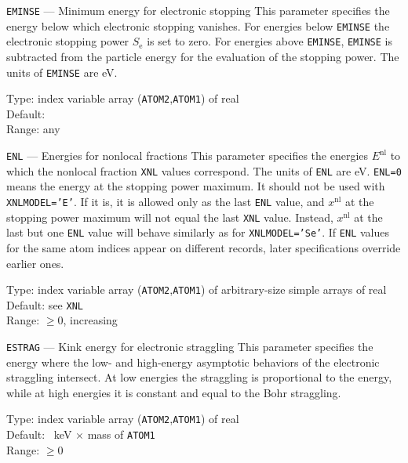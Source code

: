 \begin{keydescription}{\texttt{EMINSE} --- Minimum energy for electronic
    stopping}
%
  This parameter specifies the energy below which electronic stopping
  vanishes. For energies below \texttt{EMINSE} the electronic stopping
  power $S_\mathrm{e}$ is set to zero. For energies above \texttt{EMINSE},
  \texttt{EMINSE} is subtracted from the particle energy for the evaluation
  of the stopping power. The units of \texttt{EMINSE} are eV.
  \begin{keytab}
    Type:    \> index variable array (\texttt{ATOM2},\texttt{ATOM1}) 
                of real \\
    Default:  \\
    Range:   \> any
  \end{keytab}
\end{keydescription}

\begin{keydescription}{\texttt{ENL} --- Energies for nonlocal fractions}
%
  This parameter specifies the energies $E^\mathrm{nl}$ to which the
  nonlocal fraction \texttt{XNL} values correspond. The units of \texttt{ENL}
  are eV. \texttt{ENL=0} means the energy at the stopping power maximum. It 
  should not be used with \texttt{XNLMODEL='E'}. If it is, it is allowed only as 
  the last \texttt{ENL} value, and $x^\mathrm{nl}$ at the stopping power
  maximum will not equal the last \texttt{XNL} value. Instead, $x^\mathrm{nl}$
  at the last but one \texttt{ENL} value will behave similarly as for 
  \texttt{XNLMODEL='Se'}. If \texttt{ENL} values for the same atom indices 
  appear on different records, later specifications override earlier ones.
  \begin{keytab}
    Type:    \> index variable array (\texttt{ATOM2},\texttt{ATOM1}) 
                of arbitrary-size simple arrays of real \\
    Default: \> see \texttt{XNL} \\
    Range:   \> $\ge 0$, increasing
  \end{keytab}
\end{keydescription}

\begin{keydescription}{\texttt{ESTRAG} --- Kink energy for electronic
    straggling}
%
  This parameter specifies the energy where the low- and high-energy
  asymptotic behaviors of the electronic straggling intersect. At low
  energies the straggling is proportional to the energy, while at high
  energies it is constant and equal to the Bohr straggling.
  \begin{keytab}
    Type:    \> index variable array (\texttt{ATOM2},\texttt{ATOM1}) 
                of real \\
    Default: ~keV $\times$ mass of \texttt{ATOM1} \\
    Range:   \> $\ge 0$
  \end{keytab}
\end{keydescription}

